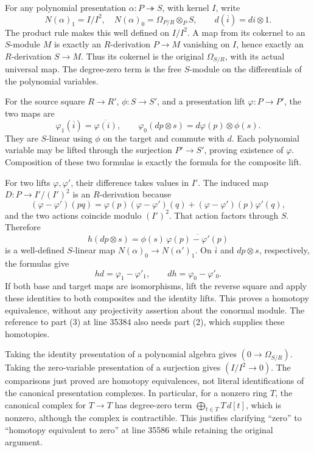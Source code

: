 For any polynomial presentation \(\alpha:P\twoheadrightarrow S\), with kernel \(I\), write \[
N(\alpha)_1=I/I^2,\quad N(\alpha)_0=\Omega_{P/R}\otimes_P S,
\qquad d(\overline i)=di\otimes1.
\] The product rule makes this well defined on \(I/I^2\). A map from its cokernel to an \(S\)-module \(M\) is exactly an \(R\)-derivation \(P\to M\) vanishing on \(I\), hence exactly an \(R\)-derivation \(S\to M\). Thus its cokernel is the original \(\Omega_{S/R}\), with its actual universal map. The degree-zero term is the free \(S\)-module on the differentials of the polynomial variables.

For the source square \(R\to R'\), \(\phi:S\to S'\), and a presentation lift \(\varphi:P\to P'\), the two maps are \[
\varphi_1(\overline i)=\overline{\varphi(i)},\qquad
\varphi_0(dp\otimes s)=d\varphi(p)\otimes\phi(s).
\] They are \(S\)-linear using \(\phi\) on the target and commute with \(d\). Each polynomial variable may be lifted through the surjection \(P'\to S'\), proving existence of \(\varphi\). Composition of these two formulas is exactly the formula for the composite lift.

For two lifts \(\varphi,\varphi'\), their difference takes values in \(I'\). The induced map \(D:P\to I'/(I')^2\) is an \(R\)-derivation because \[
(\varphi-\varphi')(pq)=\varphi(p)(\varphi-\varphi')(q)
+(\varphi-\varphi')(p)\varphi'(q),
\] and the two actions coincide modulo \((I')^2\). That action factors through \(S\). Therefore \[
h(dp\otimes s)=\phi(s)\,\overline{\varphi(p)-\varphi'(p)}
\] is a well-defined \(S\)-linear map \(N(\alpha)_0\to N(\alpha')_1\). On \(\overline i\) and \(dp\otimes s\), respectively, the formulas give \[
hd=\varphi_1-\varphi'_1,\qquad dh=\varphi_0-\varphi'_0.
\] If both base and target maps are isomorphisms, lift the reverse square and apply these identities to both composites and the identity lifts. This proves a homotopy equivalence, without any projectivity assertion about the conormal module. The reference to part (3) at line 35384 also needs part (2), which supplies these homotopies.

Taking the identity presentation of a polynomial algebra gives \((0\to\Omega_{S/R})\). Taking the zero-variable presentation of a surjection gives \((I/I^2\to0)\). The comparisons just proved are homotopy equivalences, not literal identifications of the canonical presentation complexes. In particular, for a nonzero ring \(T\), the canonical complex for \(T\to T\) has degree-zero term \(\bigoplus_{t\in T}T\,d[t]\), which is nonzero, although the complex is contractible. This justifies clarifying ``zero'' to ``homotopy equivalent to zero'' at line 35586 while retaining the original argument.

